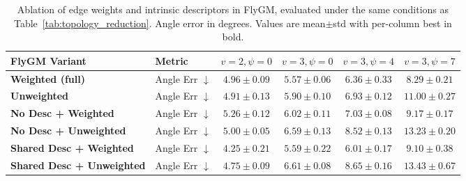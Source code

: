 \documentclass[a4paper]{easychair}
\begin{document}
\begin{table}[htbp]
\centering
\footnotesize
\setlength{\tabcolsep}{4pt}
\renewcommand{\arraystretch}{1.1}
\begin{tabular}{ll cccc}
\toprule
\textbf{FlyGM Variant} & \textbf{Metric}  & $v{=}2,\psi{=}0$ & $v{=}3,\psi{=}0$ & $v{=}3,\psi{=}4$ & $v{=}3,\psi{=}7$ \\
\midrule
{\textbf{Weighted (full)}}
& Angle Err $\downarrow$ & $4.96{\pm}0.09$ & $\mathbf{5.57{\pm}0.06}$ & $6.36{\pm}0.33$ & $\mathbf{8.29{\pm}0.21}$ \\
\midrule
{\textbf{Unweighted}}
& Angle Err $\downarrow$ & $4.91{\pm}0.13$ & $5.90{\pm}0.10$ & $6.93{\pm}0.12$ & $11.00{\pm}0.27$ \\
\midrule
{\textbf{No Desc + Weighted}}
& Angle Err $\downarrow$ & $5.26{\pm}0.12$ & $6.02{\pm}0.11$ & $7.03{\pm}0.08$ & $9.17{\pm}0.17$ \\
\midrule
{\textbf{No Desc + Unweighted}}
& Angle Err $\downarrow$ & $5.00{\pm}0.05$ & $6.59{\pm}0.13$ & $8.52{\pm}0.13$ & $13.23{\pm}0.20$ \\
\midrule
{\textbf{Shared Desc + Weighted}}
& Angle Err $\downarrow$ & $\mathbf{4.25{\pm}0.21}$ & $5.59{\pm}0.22$ & $\mathbf{6.01{\pm}0.17}$ & $9.10{\pm}0.38$ \\
\midrule
{\textbf{Shared Desc + Unweighted}}
& Angle Err $\downarrow$ & $4.75{\pm}0.09$ & $6.61{\pm}0.08$ & $8.65{\pm}0.16$ & $13.43{\pm}0.67$ \\
\bottomrule
\end{tabular}
\vspace{1em}
\caption{Ablation of edge weights and intrinsic descriptors in FlyGM, evaluated under the same conditions as Table~\ref{tab:topology_reduction}. Angle error in degrees. Values are mean$\pm$std with per-column best in bold.}
\label{tab:flygm_ablation}
\end{table}
\end{document}
